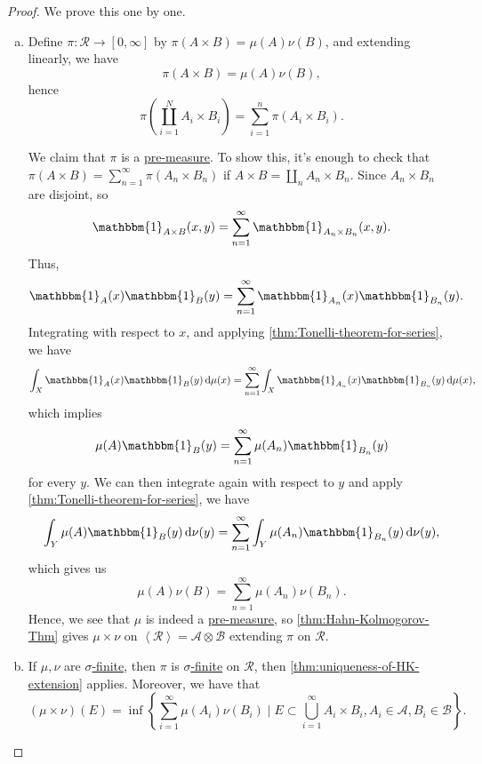 \begin{proof}
	We prove this one by one.
	\begin{enumerate}[(a)]
		\item Define \(\pi \colon \mathcal{R} \to [0, \infty ]\) by \(\pi (A \times B) = \mu (A)\nu (B)\), and extending linearly, we have
		      \[
			      \pi (A\times B) = \mu (A)\nu (B),
		      \]
		      hence
		      \[
			      \pi \left(\coprod_{i=1}^{N} A_{i} \times B_{i} \right) = \sum_{i=1}^{n} \pi (A_{i} \times B_{i}).
		      \]

		      We claim that \(\pi \) is a \hyperref[def:pre-measure]{pre-measure}. To show this, it's enough to check that \(\pi (A\times B) = \sum_{n=1}^{\infty} \pi (A_{n} \times B_{n} )\)
		      if \(A\times B = \coprod_{n}A_{n} \times B_{n}  \). Since \(A_{n} \times B_{n} \) are disjoint, so
		      \[
			      \mathbbm{1}_{A\times B}(x, y) = \sum_{n=1}^{\infty} \mathbbm{1}_{A_{n} \times B_{n} }(x, y).
		      \]
		      Thus,
		      \[
			      \mathbbm{1}_{A} (x)\mathbbm{1}_{B} (y) = \sum_{n=1}^{\infty} \mathbbm{1}_{A_{n} }(x)\mathbbm{1}_{B_{n}}(y).
		      \]
		      Integrating with respect to \(x\), and applying \autoref{thm:Tonelli-theorem-for-series}, we have
		      \[
			      \int _X \mathbbm{1}_{A} (x)\mathbbm{1}_{B}(y)\,\mathrm{d} \mu (x) = \sum_{n=1}^{\infty} \int _X \mathbbm{1}_{A_{n} }(x)\mathbbm{1}_{B_{n} }(y)\,\mathrm{d} \mu (x),
		      \]
		      which implies
		      \[
			      \mu (A)\mathbbm{1}_{B} (y) = \sum_{n=1}^{\infty} \mu (A_{n} )\mathbbm{1}_{B_{n} }(y)
		      \]
		      for every \(y\). We can then integrate again with respect to \(y\) and apply \autoref{thm:Tonelli-theorem-for-series}, we have
		      \[
			      \int _Y \mu (A)\mathbbm{1}_{B}(y)\,\mathrm{d} \nu (y) = \sum_{n=1}^{\infty} \int _Y \mu (A_{n} )\mathbbm{1}_{B_{n} }(y)\,\mathrm{d} \nu (y),
		      \]
		      which gives us
		      \[
			      \mu (A)\nu (B) = \sum_{n=1}^{\infty} \mu (A_{n} )\nu (B_{n} ).
		      \]
		      Hence, we see that \(\mu\) is indeed a \hyperref[def:pre-measure]{pre-measure}, so  \autoref{thm:Hahn-Kolmogorov-Thm} gives \(\mu \times \nu \) on \(\left< \mathcal{R}  \right> = \mathcal{A} \otimes \mathcal{B}  \)
		      extending \(\pi \) on \(\mathcal{R} \).
		\item If \(\mu , \nu \) are \hyperref[def:sigma-finite-measure]{\(\sigma\)-finite}, then \(\pi \) is  \hyperref[def:sigma-finite-measure]{\(\sigma\)-finite} on \(\mathcal{R} \), then
		      \autoref{thm:uniqueness-of-HK-extension} applies. Moreover, we have that
		      \[
			      (\mu \times \nu )(E) = \inf \left\{\sum_{i=1}^{\infty} \mu (A_{i})\nu (B_{i})\mid E\subset \bigcup_{i=1}^{\infty} A_{i} \times B_{i}, A_{i} \in \mathcal{A} , B_{i} \in \mathcal{B} \right\}.
		      \]
	\end{enumerate}
\end{proof}

